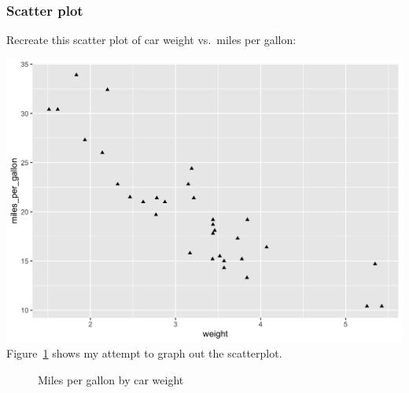 \documentclass[
  man,
  floatsintext,
  longtable,
  nolmodern,
  notxfonts,
  notimes,
  colorlinks=true,linkcolor=blue,citecolor=blue,urlcolor=blue]{apa7}
\begin{document}
\subsubsection{Scatter plot}\label{scatter-plot}

Recreate this scatter plot of car weight vs.~miles per gallon:

\includegraphics{plots/plot3.png} Figure~\ref{fig-plot3-scatterplot}
shows my attempt to graph out the scatterplot.

\begin{figure}

\caption{\label{fig-plot3-scatterplot}Miles per gallon by car weight}


\end{figure}%
\end{document}
